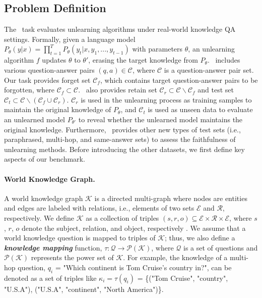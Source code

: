 \subsection{Problem Definition}
\label{problem_def}
The \ourdata~task evaluates unlearning algorithms under real-world knowledge QA settings.
Formally, given a language model $P_{\theta}(y|x) = \prod_{t=1}^{T} P_{\theta}(y_{t}|x,y_{1},...,y_{t-1})$ with parameters $\theta$, an unlearning algorithm $f$ updates $\theta$ to $\theta'$, erasing the target knowledge from $P_{\theta}$.
\ourdata~includes various question-answer pairs $(q, a) \in \mathcal{C}$, where $\mathcal{C}$ is a question-answer pair set.
Our task provides forget set $\mathcal{C}_{f}$, which contains target question-answer pairs to be forgotten, where $\mathcal{C}_{f} \subset \mathcal{C}$.
\ourdata~also provides retain set $\mathcal{C}_{r}\subset \mathcal{C} \backslash \mathcal{C}_{f}$ and test set $\mathcal{C}_{t}\subset \mathcal{C} \backslash (\mathcal{C}_{f} \cup \mathcal{C}_{r})$.
$\mathcal{C}_{r}$ is used in the unlearning process as training samples to maintain the original knowledge of $P_{\theta}$, and $\mathcal{C}_{t}$ is used as unseen data to evaluate an unlearned model $P_{\theta'}$ to reveal whether the unlearned model maintains the original knowledge.
Furthermore, \ourdata~provides other new types of test sets (i.e., paraphrased, multi-hop, and same-answer sets) to assess the faithfulness of unlearning methods. Before introducing the other datasets, we first define key aspects of our benchmark.







\paragraph{World Knowledge Graph.}
A world knowledge graph $\mathcal{K}$ is a directed multi-graph where nodes are entities and edges are labeled with relations, i.e., elements of two sets $\mathcal{E}$ and $\mathcal{R}$, respectively.
We define $\mathcal{K}$ as a collection of triples $(s,r,o) \subseteq \mathcal{E} \times \mathcal{R} \times \mathcal{E}$, where $s$, $r$, $o$ denote the subject, relation, and object, respectively \citep{ruffinelli2020you, loconte2024turn}.
We assume that a world knowledge question is mapped to triples of $\mathcal{K}$; thus, we also define a \textbf{\textit{knowledge mapping}} function, $\tau: \mathcal{Q} \rightarrow \mathcal{P}(\mathcal{K})$, where $\mathcal{Q}$ is a set of questions and $\mathcal{P}(\mathcal{K})$ represents the power set of $\mathcal{K}$.
For example, the knowledge of a multi-hop question, $q_{i}$ = "Which continent is Tom Cruise’s country in?", can be denoted as a set of triples like $\kappa_{i} = \tau(q_{i})$ = \{("Tom Cruise", "country", "U.S.A"), ("U.S.A", "continent", "North America")\}.




